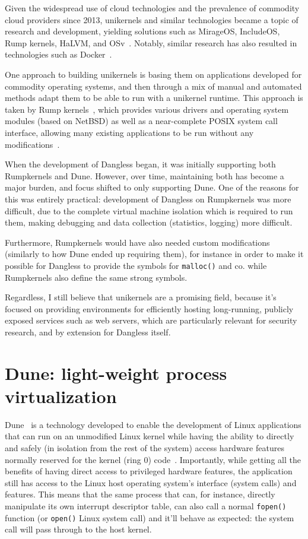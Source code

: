Given the widespread use of cloud technologies and the prevalence of commodity cloud providers since 2013, unikernels and similar technologies became a topic of research and development, yielding solutions such as MirageOS, IncludeOS, Rump kernels, HaLVM, and OSv~\cite{unikernels-list}. Notably, similar research has also resulted in technologies such as Docker~\cite{docker-web}.

One approach to building unikernels is basing them on applications developed for commodity operating systems, and then through a mix of manual and automated methods adapt them to be able to run with a unikernel runtime. This approach is taken by Rump kernels~\cite{rumpkernels-web}, which provides various drivers and operating system modules (based on NetBSD) as well as a near-complete POSIX system call interface, allowing many existing applications to be run without any modifications~\cite{rumpkernels-doc}.

When the development of Dangless began, it was initially supporting both Rumpkernels and Dune. However, over time, maintaining both has become a major burden, and focus shifted to only supporting Dune. One of the reasons for this was entirely practical: development of Dangless on Rumpkernels was more difficult, due to the complete virtual machine isolation which is required to run them, making debugging and data collection (statistics, logging) more difficult.

Furthermore, Rumpkernels would have also needed custom modifications (similarly to how Dune ended up requiring them), for instance in order to make it possible for Dangless to provide the symbols for \lstinline!malloc()! and co. while Rumpkernels also define the same strong symbols.

Regardless, I still believe that unikernels are a promising field, because it's focused on providing environments for efficiently hosting long-running, publicly exposed services such as web servers, which are particularly relevant for security research, and by extension for Dangless itself.

\section{Dune: light-weight process virtualization}
\label{sec:bg-dune}

Dune~\cite{dune-website} is a technology developed to enable the development of Linux applications that can run on an unmodified Linux kernel while having the ability to directly and safely (in isolation from the rest of the system) access hardware features normally reserved for the kernel (ring 0) code~\cite{dune-paper}. Importantly, while getting all the benefits of having direct access to privileged hardware features, the application still has access to the Linux host operating system's interface (system calls) and features. This means that the same process that can, for instance, directly manipulate its own interrupt descriptor table, can also call a normal \lstinline!fopen()! function (or \lstinline!open()! Linux system call) and it'll behave as expected: the system call will pass through to the host kernel.

